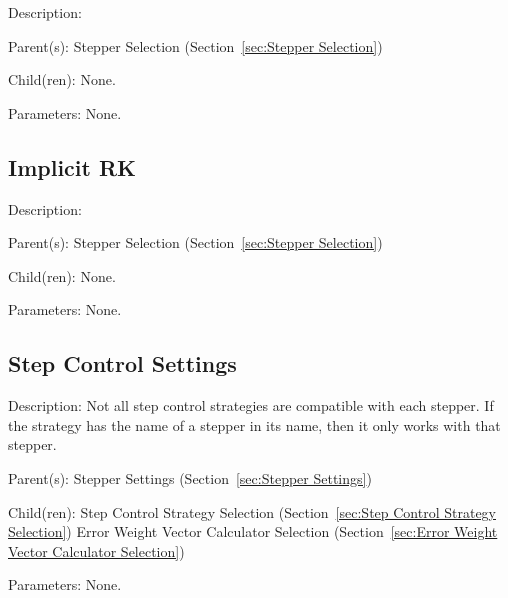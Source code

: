 \begin{list}{}
  {\setlength{\leftmargin}{1.0in}
   \setlength{\labelwidth}{0.75in}
   \setlength{\labelsep}{0.125in}}
  \item[Description:]
  \item[Parent(s):]
    Stepper Selection (Section~\ref{sec:Stepper Selection})
  \item[Child(ren):]
    None. 
  \item[Parameters:]
    None. 
\end{list}

\subsection{Implicit RK}
\label{sec:Implicit RK}

\begin{list}{}
  {\setlength{\leftmargin}{1.0in}
   \setlength{\labelwidth}{0.75in}
   \setlength{\labelsep}{0.125in}}
  \item[Description:]
  \item[Parent(s):]
    Stepper Selection (Section~\ref{sec:Stepper Selection})
  \item[Child(ren):]
    None. 
  \item[Parameters:]
    None. 
\end{list}

\subsection{Step Control Settings}
\label{sec:Step Control Settings}

\begin{list}{}
  {\setlength{\leftmargin}{1.0in}
   \setlength{\labelwidth}{0.75in}
   \setlength{\labelsep}{0.125in}}
  \item[Description:]
    Not all step control strategies are compatible with each stepper.  If the strategy
    has the name of a stepper in its name, then it only works with that stepper.
  \item[Parent(s):]
    Stepper Settings (Section~\ref{sec:Stepper Settings})
  \item[Child(ren):]
    Step Control Strategy Selection (Section~\ref{sec:Step Control Strategy Selection})
      \newline 
    Error Weight Vector Calculator Selection (Section~\ref{sec:Error Weight Vector Calculator Selection})
  \item[Parameters:]
    None. 
\end{list}

